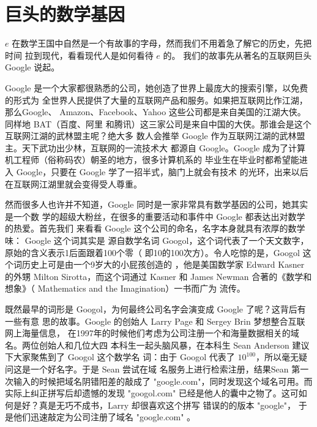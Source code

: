 \section{巨头的数学基因}
$e$ 在数学王国中自然是一个有故事的字母，然而我们不用着急了解它的历史，先把时间
拉到现代，看看现代人是如何看待 $e$ 的。 我们的故事先从著名的互联网巨头 Google 
说起。

Google 是一个大家都很熟悉的公司，她创造了世界上最庞大的搜索引擎，以免费的形式为
全世界人民提供了大量的互联网产品和服务。如果把互联网比作江湖，那么Google、
Amazon、Facebook、Yahoo 这些公司都是来自美国的江湖大侠。同样地 BAT（百度、阿里
和腾讯）这三家公司是来自中国的大侠。那谁会是这个互联网江湖的武林盟主呢？绝大多
数人会推举 Google 作为互联网江湖的武林盟主。天下武功出少林，互联网的一流技术大
都源自 Google。Google 成为了计算机工程师（俗称码农）朝圣的地方，很多计算机系的
毕业生在毕业时都希望能进入 Google，只要在 Google 学了一招半式，脑门上就会有技术
的光环，出来以后在互联网江湖里就会变得受人尊重。

然而很多人也许并不知道，Google 同时是一家非常具有数学基因的公司，她其实是一个数
学的超级大粉丝，在很多的重要活动和事件中 Google 都表达出对数学的热爱。首先我们
来看看 Google 这个公司的命名，名字本身就具有浓厚的数学味： Google 这个词其实是
源自数学名词 Googol，这个词代表了一个天文数字，原始的含义表示1后面跟着100个零（
即10的100次方）。令人吃惊的是，Googol 这个词历史上可是由一个9岁大的小屁孩创造的
，他是美国数学家 Edward Kasner 的外甥 Milton Sirotta，而这个词通过 Kasner 和
James Newman 合著的《数学和想象》（ Mathematics and the Imagination）一书而广为
流传。

既然最早的词形是 Googol，为何最终公司名字会演变成 Google 了呢？这背后有一些有意
思的故事。Google 的创始人 Larry Page 和 Sergey Brin 梦想整合互联网上海量信息，
在1997年的时候他们考虑为公司注册一个和海量数据相关的域名。两位创始人和几位大四
本科生一起头脑风暴，在本科生 Sean Anderson 建议下大家聚焦到了 Googol 这个数学名
词：由于 Googol 代表了 $10^100$，所以毫无疑问这是一个好名字。于是 Sean 尝试在域
名服务上进行检索注册，结果Sean 第一次输入的时候把域名阴错阳差的敲成了
"google.com"，同时发现这个域名可用。而实际上纠正拼写后却遗憾的发现 "googol.com"
已经是他人的囊中之物了。这可如何是好？真是无巧不成书，Larry 却很喜欢这个拼写
错误的的版本 "google"， 于是他们迅速敲定为公司注册了域名 "google.com" 。

